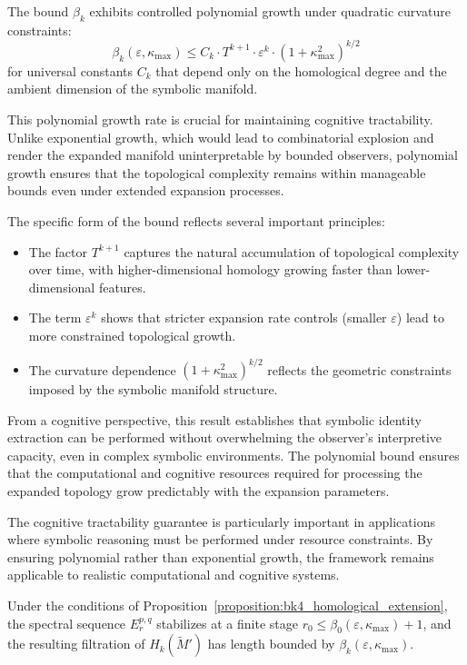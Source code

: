 \begin{remark}
\label{remark:bk4_betti_growth}
The bound $\beta_k$ exhibits controlled polynomial growth under quadratic curvature constraints:
\[
\beta_k(\varepsilon,\kappa_{\max}) \leq C_k \cdot T^{k+1} \cdot \varepsilon^k \cdot (1+\kappa_{\max}^2)^{k/2}
\]
for universal constants $C_k$ that depend only on the homological degree and the ambient dimension of the symbolic manifold.

This polynomial growth rate is crucial for maintaining cognitive tractability. Unlike exponential growth, which would lead to combinatorial explosion and render the expanded manifold uninterpretable by bounded observers, polynomial growth ensures that the topological complexity remains within manageable bounds even under extended expansion processes.

The specific form of the bound reflects several important principles:
\begin{itemize}
\item The factor $T^{k+1}$ captures the natural accumulation of topological complexity over time, with higher-dimensional homology growing faster than lower-dimensional features.
\item The term $\varepsilon^k$ shows that stricter expansion rate controls (smaller $\varepsilon$) lead to more constrained topological growth.
\item The curvature dependence $(1+\kappa_{\max}^2)^{k/2}$ reflects the geometric constraints imposed by the symbolic manifold structure.
\end{itemize}

From a cognitive perspective, this result establishes that symbolic identity extraction can be performed without overwhelming the observer's interpretive capacity, even in complex symbolic environments. The polynomial bound ensures that the computational and cognitive resources required for processing the expanded topology grow predictably with the expansion parameters.
\end{remark}

The cognitive tractability guarantee is particularly important in applications where symbolic reasoning must be performed under resource constraints. By ensuring polynomial rather than exponential growth, the framework remains applicable to realistic computational and cognitive systems.

\begin{lemma}
\label{lemma:bk4_spectral_stability_homological_extensions}
Under the conditions of Proposition~\ref{proposition:bk4_homological_extension}, the spectral sequence $E_r^{p,q}$ stabilizes at a finite stage $r_0 \leq \beta_0(\varepsilon, \kappa_{\max}) + 1$, and the resulting filtration of $H_k(\widetilde{M}')$ has length bounded by $\beta_k(\varepsilon, \kappa_{\max})$.
\end{lemma}

